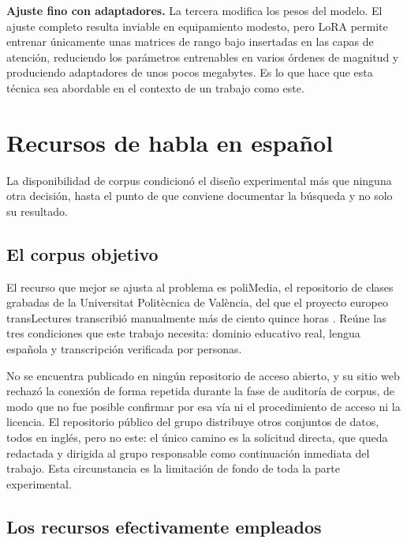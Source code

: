 \textbf{Ajuste fino con adaptadores.} La tercera modifica los pesos del modelo. El ajuste
completo resulta inviable en equipamiento modesto, pero LoRA \cite{hu2021lora} permite
entrenar únicamente unas matrices de rango bajo insertadas en las capas de atención,
reduciendo los parámetros entrenables en varios órdenes de magnitud y produciendo
adaptadores de unos pocos megabytes. Es lo que hace que esta técnica sea abordable en el
contexto de un trabajo como este.

\section{Recursos de habla en español}

La disponibilidad de corpus condicionó el diseño experimental más que ninguna otra
decisión, hasta el punto de que conviene documentar la búsqueda y no solo su resultado.

\subsection{El corpus objetivo}

El recurso que mejor se ajusta al problema es poliMedia, el repositorio de clases grabadas
de la Universitat Politècnica de València, del que el proyecto europeo transLectures
transcribió manualmente más de ciento quince horas \cite{deltoro2014translectures}. Reúne
las tres condiciones que este trabajo necesita: dominio educativo real, lengua española y
transcripción verificada por personas.

No se encuentra publicado en ningún repositorio de acceso abierto, y su sitio web rechazó
la conexión de forma repetida durante la fase de auditoría de corpus, de modo que no fue
posible confirmar por esa vía ni el procedimiento de acceso ni la licencia. El repositorio
público del grupo distribuye otros conjuntos de datos, todos en inglés, pero no este: el
único camino es la solicitud directa, que queda redactada y dirigida al grupo responsable
como continuación inmediata del trabajo. Esta circunstancia es la limitación de fondo de
toda la parte experimental.

\subsection{Los recursos efectivamente empleados}

